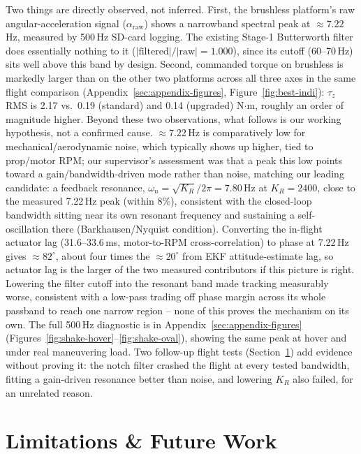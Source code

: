 \documentclass[11pt,a4paper]{article}
\begin{document}
Two things are directly observed, not inferred. First, the brushless platform's raw
angular-acceleration signal ($\alpha_{\mathrm{raw}}$) shows a narrowband spectral peak at
$\approx7.22$\,Hz, measured by 500\,Hz SD-card logging. The existing Stage-1 Butterworth filter
does essentially nothing to it ($|\mathrm{filtered}|/|\mathrm{raw}|=1.000$), since its cutoff
(60--70\,Hz) sits well above this band by design. Second, commanded torque on brushless is
markedly larger than on the other two platforms across all three axes in the same flight
comparison (Appendix~\ref{sec:appendix-figures}, Figure~\ref{fig:best-indi}): $\tau_z$ RMS is
2.17 vs.\ 0.19 (standard) and 0.14 (upgraded) N$\cdot$m, roughly an order of magnitude higher.
Beyond these two observations, what follows is our working hypothesis, not a confirmed cause.
$\approx7.22$\,Hz is comparatively low for mechanical/aerodynamic noise, which typically shows up
higher, tied to prop/motor RPM; our supervisor's assessment was that a peak this low points toward
a gain/bandwidth-driven mode rather than noise, matching our leading candidate: a feedback
resonance, $\omega_n=\sqrt{K_R}/2\pi = 7.80$\,Hz at $K_R=2400$, close to the measured 7.22\,Hz
peak (within 8\%), consistent with the closed-loop bandwidth sitting near its own resonant
frequency and sustaining a self-oscillation there (Barkhausen/Nyquist
condition). Converting the in-flight actuator lag (31.6--33.6\,ms, motor-to-RPM cross-correlation)
to phase at 7.22\,Hz gives
$\approx82^\circ$, about four times the $\approx20^\circ$ from EKF attitude-estimate lag, so
actuator lag is the larger of the two measured contributors if this picture is right. Lowering the
filter cutoff into the resonant band made tracking measurably worse, consistent with a low-pass
trading off phase margin across its whole passband to reach one narrow region -- none of this
proves the mechanism on its own. The full 500\,Hz diagnostic is in
Appendix~\ref{sec:appendix-figures} (Figures~\ref{fig:shake-hover}--\ref{fig:shake-oval}), showing
the same peak at hover and under real maneuvering load. Two follow-up flight tests
(Section~\ref{sec:limitations}) add evidence without proving it: the notch filter crashed the
flight at every tested bandwidth, fitting a gain-driven resonance better than noise, and lowering
$K_R$ also failed, for an unrelated reason.

\section{Limitations \& Future Work}
\label{sec:limitations}
\end{document}
